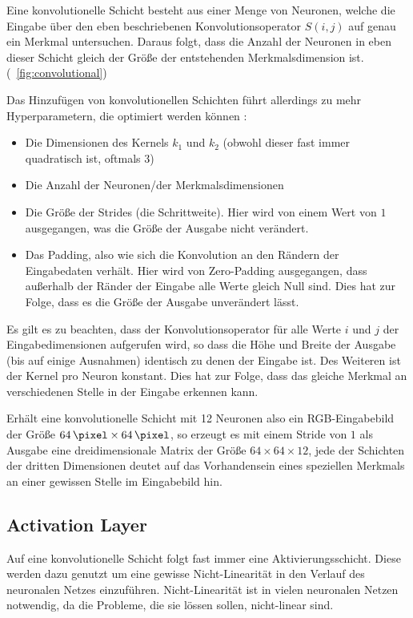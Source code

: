 Eine konvolutionelle Schicht besteht aus einer Menge von Neuronen, welche die Eingabe über den eben beschriebenen Konvolutionsoperator $S(i,j)$ auf genau ein Merkmal untersuchen. Daraus folgt, dass die Anzahl der Neuronen in eben dieser Schicht gleich der Größe der entstehenden Merkmalsdimension ist. (\vgl \figurename~\ref{fig:convolutional})

Das Hinzufügen von konvolutionellen Schichten führt allerdings zu mehr Hyperparametern, die optimiert werden können \cite{cs231n}:
\begin{itemize}
	\item Die Dimensionen des Kernels $k_1$ und $k_2$ (obwohl dieser fast immer quadratisch ist, oftmals $3$)
	\item Die Anzahl der Neuronen/der Merkmalsdimensionen
	\item Die Größe der Strides (die Schrittweite). Hier wird von einem Wert von $1$ ausgegangen, was die Größe der Ausgabe nicht verändert.
	\item Das Padding, also wie sich die Konvolution an den Rändern der Eingabedaten verhält. Hier wird von Zero-Padding ausgegangen, \dahe dass außerhalb der Ränder der Eingabe alle Werte gleich Null sind. Dies hat zur Folge, dass es die Größe der Ausgabe unverändert lässt.
\end{itemize}

Es gilt es zu beachten, dass der Konvolutionsoperator für alle Werte $i$ und $j$ der Eingabedimensionen aufgerufen wird, so dass die Höhe und Breite der Ausgabe (bis auf einige Ausnahmen) identisch zu denen der Eingabe ist.
Des Weiteren ist der Kernel pro Neuron konstant. Dies hat \ua zur Folge, dass das gleiche Merkmal an verschiedenen Stelle in der Eingabe erkennen kann.

Erhält eine konvolutionelle Schicht mit 12 Neuronen also \bspw ein RGB-Eingabebild der Größe $\SI{64}{\pixel}\times\SI{64}{\pixel}$, so erzeugt es mit einem Stride von $1$ als Ausgabe eine dreidimensionale Matrix der Größe $64\times64\times12$, jede der Schichten der dritten Dimensionen deutet auf das Vorhandensein eines speziellen Merkmals an einer gewissen Stelle im Eingabebild hin.

\subsection{Activation Layer}
\label{ssec:activation}

Auf eine konvolutionelle Schicht folgt fast immer eine Aktivierungsschicht. Diese werden dazu genutzt um eine gewisse Nicht-Linearität in den Verlauf des neuronalen Netzes einzuführen. Nicht-Linearität ist in vielen neuronalen Netzen notwendig, da die Probleme, die sie lössen sollen, nicht-linear sind. \cite[Kap.~6]{deeplearning_16}

